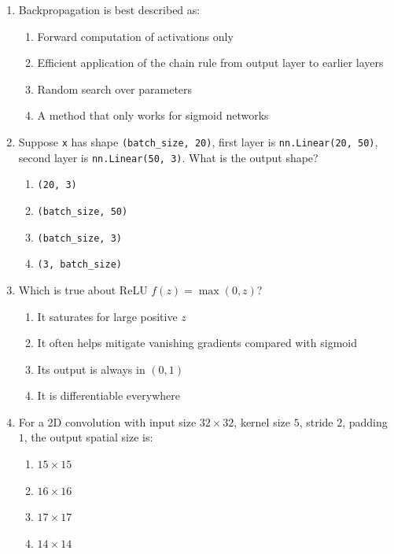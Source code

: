 \documentclass[11pt]{article}
\newcommand{\cmark}{\ding{51}}
\begin{document}
\begin{enumerate}[leftmargin=*]
\item Backpropagation is best described as:

\begin{enumerate}[label=\Alph*.]
    \item Forward computation of activations only
    \item Efficient application of the chain rule from output layer to earlier layers \cmark
    \item Random search over parameters
    \item A method that only works for sigmoid networks
\end{enumerate}

\item Suppose \texttt{x} has shape \texttt{(batch\_size, 20)}, first layer is \texttt{nn.Linear(20, 50)}, second layer is \texttt{nn.Linear(50, 3)}. What is the output shape?

\begin{enumerate}[label=\Alph*.]
    \item \texttt{(20, 3)}
    \item \texttt{(batch\_size, 50)}
    \item \texttt{(batch\_size, 3)} \cmark
    \item \texttt{(3, batch\_size)}
\end{enumerate}

\item Which is true about ReLU $f(z)=\max(0,z)$?

\begin{enumerate}[label=\Alph*.]
    \item It saturates for large positive $z$
    \item It often helps mitigate vanishing gradients compared with sigmoid \cmark
    \item Its output is always in $(0,1)$
    \item It is differentiable everywhere
\end{enumerate}

\item For a 2D convolution with input size $32\times 32$, kernel size $5$, stride $2$, padding $1$, the output spatial size is:

\begin{enumerate}[label=\Alph*.]
    \item $15\times 15$ \cmark
    \item $16\times 16$
    \item $17\times 17$
    \item $14\times 14$
\end{enumerate}


\end{enumerate}
\end{document}
